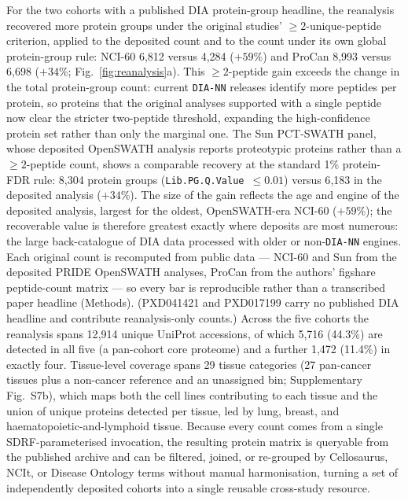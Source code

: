 \documentclass[preprint,12pt]{elsarticle}
\begin{document}
For the two cohorts with a published DIA protein-group headline, the reanalysis recovered more protein groups under the original studies' $\geq 2$-unique-peptide criterion, applied to the deposited count and to the \quantmsdiann{} count under its own global protein-group rule: NCI-60 6{,}812 versus 4{,}284 ($+59$\%) and ProCan 8{,}993 versus 6{,}698 ($+34$\%; Fig.~\ref{fig:reanalysis}a). This $\geq 2$-peptide gain exceeds the change in the total protein-group count: current \texttt{DIA-NN} releases identify more peptides per protein, so proteins that the original analyses supported with a single peptide now clear the stricter two-peptide threshold, expanding the high-confidence protein set rather than only the marginal one. The Sun PCT-SWATH panel, whose deposited OpenSWATH analysis reports proteotypic proteins rather than a $\geq 2$-peptide count, shows a comparable recovery at the standard 1\% protein-FDR rule: 8{,}304 \quantmsdiann{} protein groups (\texttt{Lib.PG.Q.Value}~$\leq 0.01$) versus 6{,}183 in the deposited analysis ($+34$\%). The size of the gain reflects the age and engine of the deposited analysis, largest for the oldest, OpenSWATH-era NCI-60 ($+59$\%); the recoverable value is therefore greatest exactly where deposits are most numerous: the large back-catalogue of DIA data processed with older or non-\texttt{DIA-NN} engines. Each original count is recomputed from public data --- NCI-60 and Sun from the deposited PRIDE OpenSWATH analyses, ProCan from the authors' figshare peptide-count matrix --- so every bar is reproducible rather than a transcribed paper headline (Methods). (PXD041421 and PXD017199 carry no published DIA headline and contribute reanalysis-only counts.)
Across the five cohorts the reanalysis spans 12{,}914 unique UniProt accessions, of which 5{,}716 (44.3\%) are detected in all five (a pan-cohort core proteome) and a further 1{,}472 (11.4\%) in exactly four.
Tissue-level coverage spans 29 tissue categories (27 pan-cancer tissues plus a non-cancer reference and an unassigned bin; Supplementary Fig.~S7b), which maps both the cell lines contributing to each tissue and the union of unique proteins detected per tissue, led by lung, breast, and haematopoietic-and-lymphoid tissue. Because every count comes from a single SDRF-parameterised \quantmsdiann{} invocation, the resulting protein matrix is queryable from the published \qpx{} archive and can be filtered, joined, or re-grouped by Cellosaurus, NCIt, or Disease Ontology terms without manual harmonisation, turning a set of independently deposited cohorts into a single reusable cross-study resource.
\end{document}
